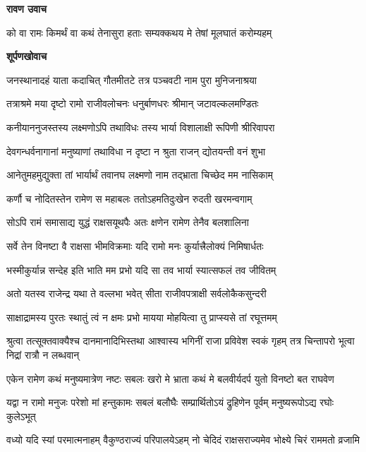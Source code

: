 \textbf{रावण उवाच}

\twolineshloka
{को वा रामः किमर्थं वा कथं तेनासुरा हताः}
{सम्यक्कथय मे तेषां मूलघातं करोम्यहम्} %

\textbf{शूर्पणखोवाच}

\twolineshloka
{जनस्थानादहं याता कदाचित् गौतमीतटे}
{तत्र पञ्चवटी नाम पुरा मुनिजनाश्रया} %

\twolineshloka
{तत्राश्रमे मया दृष्टो रामो राजीवलोचनः}
{धनुर्बाणधरः श्रीमान् जटावल्कलमण्डितः} %

\twolineshloka
{कनीयाननुजस्तस्य लक्ष्मणोऽपि तथाविधः}
{तस्य भार्या विशालाक्षी रूपिणी श्रीरिवापरा} %

\twolineshloka
{देवगन्धर्वनागानां मनुष्याणां तथाविधा}
{न दृष्टा न श्रुता राजन् द्योतयन्ती वनं शुभा} %

\twolineshloka
{आनेतुमहमुद्युक्ता तां भार्यार्थं तवानघ}
{लक्ष्मणो नाम तद्भ्राता चिच्छेद मम नासिकाम्} %

\twolineshloka
{कर्णौ च नोदितस्तेन रामेण स महाबलः}
{ततोऽहमतिदुःखेन रुदती खरमन्वगाम्} %

\twolineshloka
{सोऽपि रामं समासाद्य युद्धं राक्षसयूथपैः}
{अतः क्षणेन रामेण तेनैव बलशालिना} %

\twolineshloka
{सर्वे तेन विनष्टा वै राक्षसा भीमविक्रमाः}
{यदि रामो मनः कुर्यात्त्रैलोक्यं निमिषार्धतः} %

\twolineshloka
{भस्मीकुर्यान्न सन्देह इति भाति मम प्रभो}
{यदि सा तव भार्या स्यात्सफलं तव जीवितम्} %

\twolineshloka
{अतो यतस्व राजेन्द्र यथा ते वल्लभा भवेत्}
{सीता राजीवपत्राक्षी सर्वलोकैकसुन्दरी} %

\twolineshloka
{साक्षाद्रामस्य पुरतः स्थातुं त्वं न क्षमः प्रभो}
{मायया मोहयित्वा तु प्राप्स्यसे तां रघूत्तमम्} %

\threelineshloka
{श्रुत्वा तत्सूक्तवाक्यैश्च दानमानादिभिस्तथा}
{आश्वास्य भगिनीं राजा प्रविवेश स्वकं गृहम्}
{तत्र चिन्तापरो भूत्वा निद्रां रात्रौ न लब्धवान्} %

\fourlineindentedshloka
{एकेन रामेण कथं मनुष्यमात्रेण}
{नष्टः सबलः खरो मे}
{भ्राता कथं मे बलवीर्यदर्प\-}
{युतो विनष्टो बत राघवेण} %

\fourlineindentedshloka
{यद्वा न रामो मनुजः परेशो}
{मां हन्तुकामः सबलं बलौघैः}
{सम्प्रार्थितोऽयं द्रुहिणेन पूर्वम्}
{मनुष्यरूपोऽद्य रघोः कुलेऽभूत्} %

\fourlineindentedshloka
{वध्यो यदि स्यां परमात्मनाहम्}
{वैकुण्ठराज्यं परिपालयेऽहम्}
{नो चेदिदं राक्षसराज्यमेव}
{भोक्ष्ये चिरं राममतो व्रजामि} %


